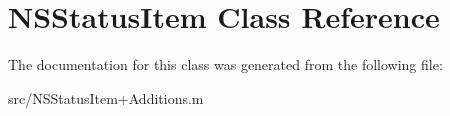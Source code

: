 \hypertarget{class_n_s_status_item}{
\section{NSStatusItem Class Reference}
\label{class_n_s_status_item}
}


The documentation for this class was generated from the following file:\begin{DoxyCompactItemize}
\item 
src/NSStatusItem+Additions.m\end{DoxyCompactItemize}
